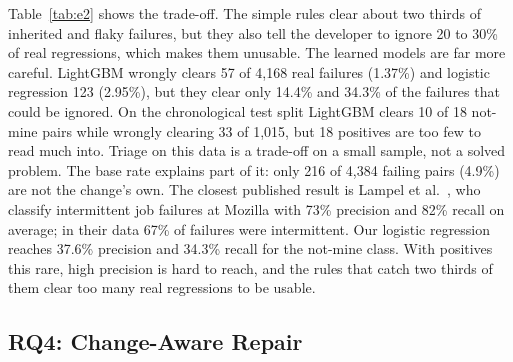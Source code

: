 \documentclass[10pt,conference]{IEEEtran}
\newcommand{\brs}{\textsc{BR-Seeded}}
\begin{document}
Table~\ref{tab:e2} shows the trade-off. The simple rules clear about two thirds of inherited and flaky failures, but they also tell the developer to ignore 20 to 30\% of real regressions, which makes them unusable. The learned models are far more careful. LightGBM wrongly clears 57 of 4,168 real failures (1.37\%) and logistic regression 123 (2.95\%), but they clear only 14.4\% and 34.3\% of the failures that could be ignored. On the chronological test split LightGBM clears 10 of 18 not-mine pairs while wrongly clearing 33 of 1,015, but 18 positives are too few to read much into. Triage on this data is a trade-off on a small sample, not a solved problem. The base rate explains part of it: only 216 of 4,384 failing pairs (4.9\%) are not the change's own. The closest published result is Lampel et al.~\cite{lampel2021oranges}, who classify intermittent job failures at Mozilla with 73\% precision and 82\% recall on average; in their data 67\% of failures were intermittent. Our logistic regression reaches 37.6\% precision and 34.3\% recall for the not-mine class. With positives this rare, high precision is hard to reach, and the rules that catch two thirds of them clear too many real regressions to be usable.

\subsection{RQ4: Change-Aware Repair}
\label{sec:rq4}

\begin{table}[t]
\caption{RQ4: Plausible Fixes (Full Test Suite Passes) on the 70 Standard \brs{} Tasks}
\label{tab:e3}
\centering
\scriptsize
\setlength{\tabcolsep}{2.8pt}
\end{table}
\end{document}
